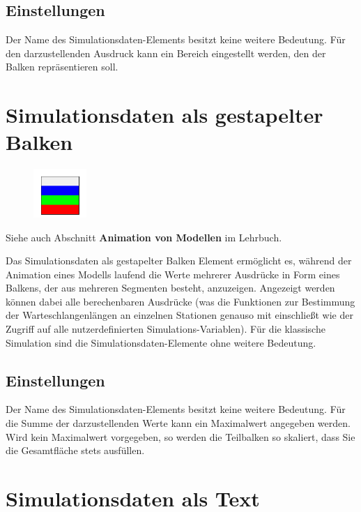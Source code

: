 \subsection*{Einstellungen}

Der Name des Simulationsdaten-Elements besitzt keine weitere Bedeutung. Für den darzustellenden Ausdruck kann
ein Bereich eingestellt werden, den der Balken repräsentieren soll.


\section{Simulationsdaten als gestapelter Balken}
\label{ref:ModelElementAnimationBarStack}

\begin{figure}
\vspace{-22pt}
\includegraphics[width=2cm]{imageModelElementAnimationBarStack.png}
\vspace{-22pt}
\end{figure}

Siehe auch Abschnitt \textbf{Animation von Modellen} im Lehrbuch.

Das Simulationsdaten als gestapelter Balken Element ermöglicht es, während der Animation eines Modells laufend die Werte
mehrerer Ausdrücke in Form eines Balkens, der aus mehreren Segmenten besteht, anzuzeigen. Angezeigt werden können dabei
alle berechenbaren Ausdrücke (was die Funktionen zur Bestimmung der Warteschlangenlängen an einzelnen Stationen genauso
mit einschließt wie der Zugriff auf alle nutzerdefinierten Simulations-Variablen). Für die klassische Simulation sind die
Simulationsdaten-Elemente ohne weitere Bedeutung.

\subsection*{Einstellungen}

Der Name des Simulationsdaten-Elements besitzt keine weitere Bedeutung.
Für die Summe der darzustellenden Werte kann ein Maximalwert angegeben werden.
Wird kein Maximalwert vorgegeben, so werden die Teilbalken so skaliert,
dass Sie die Gesamtfläche stets ausfüllen.


\section{Simulationsdaten als Text}
\label{ref:ModelElementAnimationText}

